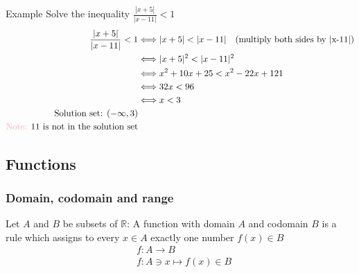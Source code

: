 \documentclass{report}
\begin{document}
		\begin{question}{Example}
			Solve the inequality $\frac{|x+5|}{|x-11|} < 1$
			\begin{align*}
				\frac{|x+5|}{|x-11|}<1 & \Longleftrightarrow |x+5| < |x-11| \quad\text{(multiply both sides by |x-11|)} \\
									   & \Longleftrightarrow |x+5|^2 < |x-11|^2 \\
									   & \Longleftrightarrow x^2 + 10x + 25 < x^2 -22x + 121 \\
									   & \Longleftrightarrow 32x < 96 \\
									   & \Longleftrightarrow x < 3 \\
				\text{Solution set: } (-\infty, 3) \\
				\text{\textcolor{pastel_red}{Note:} 11 is not in the solution set}
			\end{align*}
		\end{question}

	\subsection{Functions}
		\subsubsection{Domain, codomain and range}
			Let $A$ and $B$ be subsets of $\mathbb{R}$: A function with domain $A$ and codomain $B$ is a rule which assigns to every $x \in A$ exactly one number $f(x) \in B$
			\begin{align*}
				& f: A \rightarrow B \\ 
				& f: A \ni x \mapsto f(x) \in B
			\end{align*}

\end{document}

